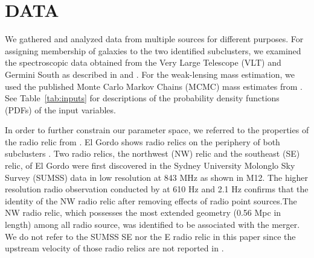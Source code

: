 \section{DATA} 
We gathered and analyzed data from multiple sources for different
purposes. For assigning membership of galaxies to the two identified subclusters, we
examined the spectroscopic data obtained from the Very Large Telescope (VLT) and
Germini South as described in  and \citet{Sifon13}.
For the weak-lensing mass estimation, we used the published
Monte Carlo Markov Chains (MCMC) mass estimates from .
See Table~\ref{tab:inputs} for descriptions of the probability density
functions (PDFs) of the input
variables. \par 
In order to further constrain our parameter space, we referred to the properties of
the radio relic from \citet{L13}. El Gordo shows radio relics on the
periphery of both subclusters . Two radio relics, the
northwest (NW) relic and the southeast (SE) relic, of El Gordo were first
discovered in the Sydney University Molonglo Sky Survey (SUMSS) data in low
resolution at 843 MHz \citep{Mauch03} as shown in M12. The higher
resolution radio observation conducted by \cite{L13} at 610 \mega Hz and
2.1 \giga Hz confirms that the identity of the NW radio relic
after removing effects of radio point sources.The NW radio relic, which
possesses the most extended geometry (0.56 Mpc in length)
among all radio source, was identified to be associated with the
merger. We do not refer to the SUMSS SE nor the E radio relic in this paper
since the upstream velocity of those radio relics are not reported in
\citet{L13}.    
%

